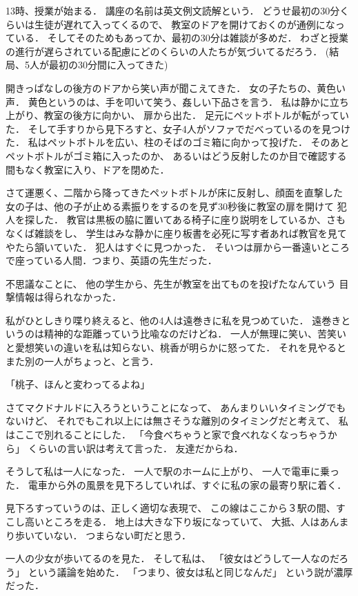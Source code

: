 \documentclass[]{article}
\begin{document}
13時、授業が始まる． 講座の名前は英文例文読解という．
どうせ最初の30分くらいは生徒が遅れて入ってくるので、
教室のドアを開けておくのが通例になっている．
そしてそのためもあってか、最初の30分は雑談が多めだ．
わざと授業の進行が遅らされている配慮にどのくらいの人たちが気づいてるだろう．
(結局、5人が最初の30分間に入ってきた)

開きっぱなしの後方のドアから笑い声が聞こえてきた．
女の子たちの、黄色い声．
黄色というのは、手を叩いて笑う、姦しい下品さを言う．
私は静かに立ち上がり、教室の後方に向かい、 扉から出た．
足元にペットボトルが転がっていた．
そして手すりから見下ろすと、女子4人がソファでだべっているのを見つけた．
私はペットボトルを広い、柱のそばのゴミ箱に向かって投げた．
そのあとペットボトルがゴミ箱に入ったのか、
あるいはどう反射したのか目で確認する間もなく教室に入り、ドアを閉めた．

さて運悪く、二階から降ってきたペットボトルが床に反射し、顔面を直撃した
女の子は、他の子が止める素振りをするのを見ず30秒後に教室の扉を開けて
犯人を探した．
教官は黒板の脇に置いてある椅子に座り説明をしているか、さもなくば雑談をし、
学生はみな静かに座り板書を必死に写す者あれば教官を見てやたら頷いていた．
犯人はすぐに見つかった．
そいつは扉から一番遠いところで座っている人間．つまり、英語の先生だった．

不思議なことに、 他の学生から、先生が教室を出てものを投げたなんていう
目撃情報は得られなかった．

私がひとしきり喋り終えると、他の4人は遠巻きに私を見つめていた．
遠巻きというのは精神的な距離っていう比喩なのだけどね．
一人が無理に笑い、苦笑いと愛想笑いの違いを私は知らない、桃香が明らかに怒ってた．
それを見やるとまた別の一人がちょっと、と言う．

「桃子、ほんと変わってるよね」

さてマクドナルドに入ろうということになって、
あんまりいいタイミングでもないけど、
それでもこれ以上には無さそうな離別のタイミングだと考えて、
私はここで別れることにした．
「今食べちゃうと家で食べれなくなっちゃうから」
くらいの言い訳は考えて言った． 友達だからね．

そうして私は一人になった． 一人で駅のホームに上がり、
一人で電車に乗った．
電車から外の風景を見下ろしていれば、すぐに私の家の最寄り駅に着く．

見下ろすっていうのは、正しく適切な表現で、
この線はここから３駅の間、すこし高いところを走る．
地上は大きな下り坂になっていて、 大抵、人はあんまり歩いていない．
つまらない町だと思う．

一人の少女が歩いてるのを見た． そして私は、
「彼女はどうして一人なのだろう」 という議論を始めた．
「つまり、彼女は私と同じなんだ」 という説が濃厚だった．
\end{document}
